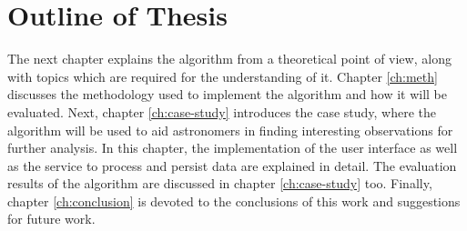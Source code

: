 \section{Outline of Thesis} \label{sect:intro:outline}

The next chapter explains the \mlblink algorithm from a theoretical point of view, along with topics which are required for the understanding of it. Chapter \ref{ch:meth} discusses the methodology used to implement the \mlblink algorithm and how it will be evaluated. Next, chapter \ref{ch:case-study} introduces the \mlblink case study, where the \mlblink algorithm will be used to aid astronomers in finding interesting observations for further analysis. In this chapter, the implementation of the user interface as well as the service to process and persist data are explained in detail. The evaluation results of the \mlblink algorithm are discussed in chapter \ref{ch:case-study} too. Finally, chapter \ref{ch:conclusion} is devoted to the conclusions of this work and suggestions for future work.